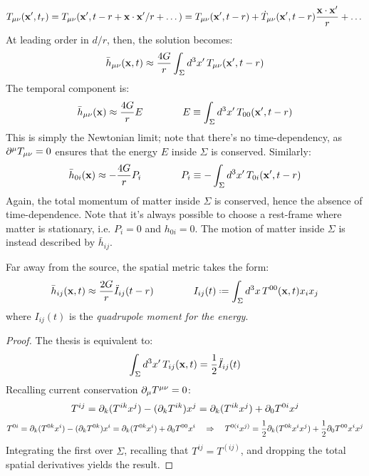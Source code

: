 \begin{equation*}
  T_{\mu \nu}(\mathbf{x}',t_r) = T_{\mu \nu} (\mathbf{x}', t - r + \mathbf{x} \cdot \mathbf{x}' / r + \dots) = T_{\mu \nu}(\mathbf{x}', t - r) + \dot{T}_{\mu \nu} (\mathbf{x}', t - r) \frac{\mathbf{x} \cdot \mathbf{x}'}{r} + \dots
\end{equation*}
At leading order in $ d/r $, then, the solution becomes:
\begin{equation*}
  \bar{h}_{\mu \nu} (\mathbf{x},t) \approx \frac{4G}{r} \int_\Sigma d^3 x'\, T_{\mu \nu}(\mathbf{x}', t - r)
\end{equation*}
The temporal component is:
\begin{equation*}
  \bar{h}_{\mu \nu}(\mathbf{x}) \approx \frac{4G}{r} E
  \qquad \qquad
  E \equiv \int_\Sigma d^3 x'\, T_{00}(\mathbf{x}', t - r)
\end{equation*}
This is simply the Newtonian limit; note that there's no time-dependency, as $ \partial^\mu T_{\mu \nu} = 0 $ ensures that the energy $ E $ inside $ \Sigma $ is conserved. Similarly:
\begin{equation*}
  \bar{h}_{0 i}(\mathbf{x}) \approx - \frac{4G}{r} P_i
  \qquad \qquad
  P_i \equiv - \int_\Sigma d^3 x'\, T_{0 i}(\mathbf{x}', t - r)
\end{equation*}
Again, the total momentum of matter inside $ \Sigma $ is conserved, hence the absence of time-dependence. Note that it's always possible to choose a rest-frame where matter is stationary, i.e. $ P_i = 0 $ and $ h_{0 i} = 0 $. The motion of matter inside $ \Sigma $ is instead described by $ \bar{h}_{ij} $.

\begin{proposition}
  Far away from the source, the spatial metric takes the form:
  \begin{equation}
    \bar{h}_{ij}(\ve{x},t) \approx \frac{2G}{r} \ddot{I}_{ij}(t - r)
    \qquad \qquad
    I_{ij}(t) \defeq \int_\Sigma d^3 x\, T^{00}(\ve{x},t) x_i x_j
    \label{eq:5.26}
  \end{equation}
  where $ I_{ij}(t) $ is the \textit{quadrupole moment for the energy}.
\end{proposition}
\begin{proof}
  The thesis is equivalent to:
  \begin{equation*}
    \int_\Sigma d^3 x'\, T_{ij}(\mathbf{x},t) = \frac{1}{2} \ddot{I}_{ij}(t)
  \end{equation*}
  Recalling current conservation $ \partial_\mu T^{\mu \nu} = 0 $:
  \begin{equation*}
    T^{ij} = \partial_k (T^{ik} x^j) - (\partial_k T^{ik}) x^j = \partial_k (T^{ik} x^j) + \partial_0 T^{0i} x^j
  \end{equation*}
  \begin{equation*}
    T^{0i} = \partial_k (T^{0k} x^i) - (\partial_k T^{0k}) x^i = \partial_k (T^{0k} x^i) + \partial_0 T^{00} x^i
    \quad \Rightarrow \quad
    T^{0(i} x^{j)} = \frac{1}{2} \partial_k (T^{0k} x^i x^j) + \frac{1}{2} \partial_0 T^{00} x^i x^j
  \end{equation*}
  Integrating the first over $ \Sigma $, recalling that $ T^{ij} = T^{(ij)} $, and dropping the total spatial derivatives yields the result.
\end{proof}

